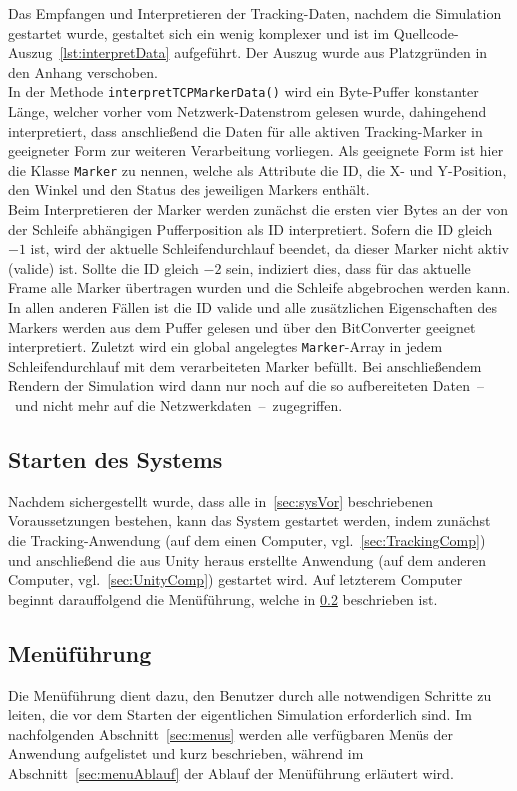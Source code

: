 Das Empfangen und Interpretieren der Tracking-Daten, nachdem die Simulation gestartet wurde, gestaltet sich ein wenig komplexer und ist im Quellcode-Auszug~\ref{lst:interpretData} aufgeführt. Der Auszug wurde aus Platzgründen in den Anhang verschoben.\\
In der Methode \texttt{interpretTCPMarkerData()} wird ein Byte-Puffer konstanter Länge, welcher vorher vom Netzwerk-Datenstrom gelesen wurde, dahingehend interpretiert, dass anschließend die Daten für alle aktiven Tracking-Marker in geeigneter Form zur weiteren Verarbeitung vorliegen. Als geeignete Form ist hier die Klasse \texttt{Marker} zu nennen, welche als Attribute die ID, die X- und Y-Position, den Winkel und den Status des jeweiligen Markers enthält.\\ 
Beim Interpretieren der Marker werden zunächst die ersten vier Bytes an der von der Schleife abhängigen Pufferposition als ID interpretiert. Sofern die ID gleich $-1$ ist, wird der aktuelle Schleifendurchlauf beendet, da dieser Marker nicht aktiv (valide) ist. Sollte die ID gleich $-2$ sein, indiziert dies, dass für das aktuelle Frame alle Marker übertragen wurden und die Schleife abgebrochen werden kann. In allen anderen Fällen ist die ID valide und alle zusätzlichen Eigenschaften des Markers werden aus dem Puffer gelesen und über den BitConverter geeignet interpretiert. Zuletzt wird ein global angelegtes \texttt{Marker}-Array in jedem Schleifendurchlauf mit dem verarbeiteten Marker befüllt. Bei anschließendem Rendern der Simulation wird dann nur noch auf die so aufbereiteten Daten~--~und nicht mehr auf die Netzwerkdaten~--~zugegriffen.

\subsection{Starten des Systems}
Nachdem sichergestellt wurde, dass alle in~\ref{sec:sysVor} beschriebenen Voraussetzungen bestehen, kann das System gestartet werden, indem zunächst die Tracking-Anwendung (auf dem einen Computer, vgl.~\ref{sec:TrackingComp}) und anschließend die aus Unity heraus erstellte Anwendung (auf dem anderen Computer, vgl.~\ref{sec:UnityComp}) gestartet wird. Auf letzterem Computer beginnt darauffolgend die Menüführung, welche in \ref{sec:menu} beschrieben ist. 
\subsection{Menüführung}\label{sec:menu}
Die Menüführung dient dazu, den Benutzer durch alle notwendigen Schritte zu leiten, die vor dem Starten der eigentlichen Simulation erforderlich sind. Im nachfolgenden Abschnitt~\ref{sec:menus} werden alle verfügbaren Menüs der Anwendung aufgelistet und kurz beschrieben, während im Abschnitt~\ref{sec:menuAblauf} der Ablauf der Menüführung erläutert wird.


